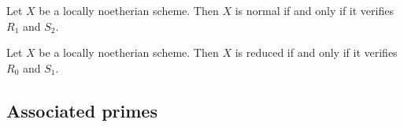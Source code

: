     \begin{theorem}
        Let $X$ be a locally noetherian scheme.
        Then $X$ is normal if and only if it verifies $R_1$ and $S_2$.
    \end{theorem}

    \begin{theorem}
        Let $X$ be a locally noetherian scheme.
        Then $X$ is reduced if and only if it verifies $R_0$ and $S_1$.
    \end{theorem}

\subsection{Associated primes}
    
    \begin{definition}
        
    \end{definition}
